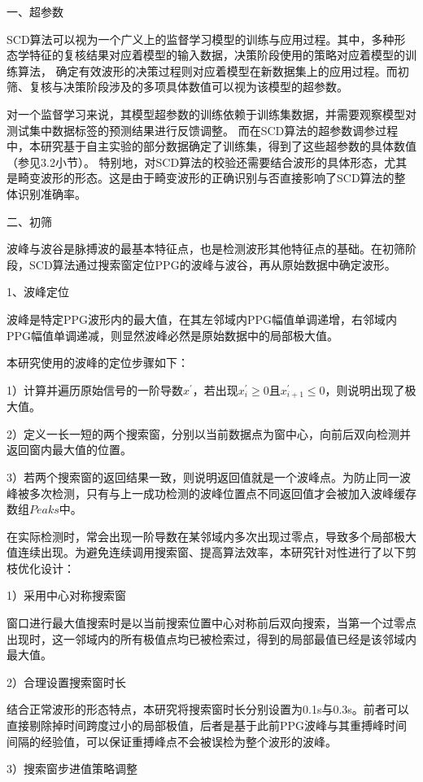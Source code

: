 一、超参数

SCD算法可以视为一个广义上的监督学习模型的训练与应用过程\cite{Zhou2016}。其中，多种形态学特征的复核结果对应着模型的输入数据，决策阶段使用的策略对应着模型的训练算法，
确定有效波形的决策过程则对应着模型在新数据集上的应用过程。而初筛、复核与决策阶段涉及的多项具体数值可以视为该模型的超参数。

对一个监督学习来说，其模型超参数的训练依赖于训练集数据，并需要观察模型对测试集中数据标签的预测结果进行反馈调整\cite{Zhou2016}。
而在SCD算法的超参数调参过程中，本研究基于自主实验的部分数据确定了训练集，得到了这些超参数的具体数值（参见3.2小节）。
特别地，对SCD算法的校验还需要结合波形的具体形态，尤其是畸变波形的形态。这是由于畸变波形的正确识别与否直接影响了SCD算法的整体识别准确率。

二、初筛

波峰与波谷是脉搏波的最基本特征点，也是检测波形其他特征点的基础。在初筛阶段，SCD算法通过搜索窗定位PPG的波峰与波谷，再从原始数据中确定波形。

1、波峰定位

波峰是特定PPG波形内的最大值，在其左邻域内PPG幅值单调递增，右邻域内PPG幅值单调递减，则显然波峰必然是原始数据中的局部极大值。

本研究使用的波峰的定位步骤如下：

1）计算并遍历原始信号的一阶导数$x^{'}$，若出现$x_i^{'}\ge 0$且$x_{i+1}^{'}\le 0$，则说明出现了极大值。

2）定义一长一短的两个搜索窗，分别以当前数据点为窗中心，向前后双向检测并返回窗内最大值的位置。

3）若两个搜索窗的返回结果一致，则说明返回值就是一个波峰点。为防止同一波峰被多次检测，只有与上一成功检测的波峰位置点不同返回值才会被加入波峰缓存数组$Peaks$中。

在实际检测时，常会出现一阶导数在某邻域内多次出现过零点，导致多个局部极大值连续出现。为避免连续调用搜索窗、提高算法效率，本研究针对性进行了以下剪枝优化设计：

1）采用中心对称搜索窗

窗口进行最大值搜索时是以当前搜索位置中心对称前后双向搜索，当第一个过零点出现时，这一邻域内的所有极值点均已被检索过，得到的局部最值已经是该邻域内最大值。

2）合理设置搜索窗时长

结合正常波形的形态特点，本研究将搜索窗时长分别设置为0.1s与0.3s。前者可以直接剔除掉时间跨度过小的局部极值，后者是基于此前PPG波峰与其重搏峰时间间隔的经验值，可以保证重搏峰点不会被误检为整个波形的波峰。

3）搜索窗步进值策略调整

